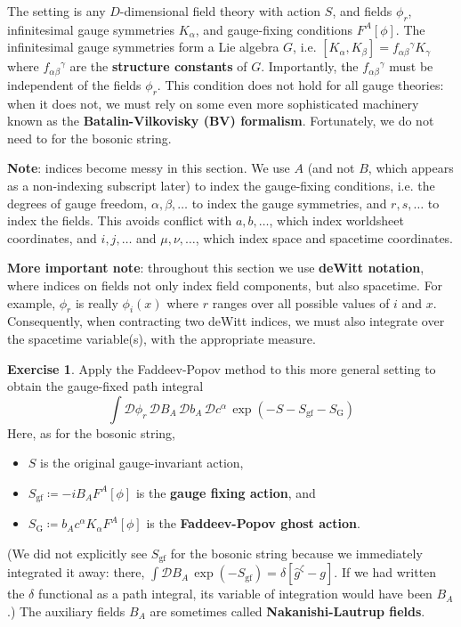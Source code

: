 \documentclass{report}
\theoremstyle{plain}
\theoremstyle{definition}
\newtheorem{exercise}{Exercise}[section]
\theoremstyle{remark}
\newcommand{\cD}{\mathcal{D}}
\begin{document}
The setting is any $D$-dimensional field theory with action $S$, and
fields $\phi_r$, infinitesimal gauge symmetries $K_\alpha$, and
gauge-fixing conditions $F^A[\phi]$. The infinitesimal gauge
symmetries form a Lie algebra $G$, i.e. $[K_\alpha, K_\beta] =
f_{\alpha\beta}{}^\gamma K_\gamma$ where $f_{\alpha\beta}{}^\gamma$
are the {\bf structure constants} of $G$. Importantly, the
$f_{\alpha\beta}{}^\gamma$ must be independent of the fields $\phi_r$.
This condition does not hold for all gauge theories: when it does not,
we must rely on some even more sophisticated machinery known as the
{\bf Batalin-Vilkovisky (BV) formalism}. Fortunately, we do not need
to for the bosonic string.

{\bf Note}: indices become messy in this section. We use $A$ (and not
$B$, which appears as a non-indexing subscript later) to index the
gauge-fixing conditions, i.e. the degrees of gauge freedom, $\alpha,
\beta, \ldots$ to index the gauge symmetries, and $r, s, \ldots$ to
index the fields. This avoids conflict with $a, b, \ldots$, which
index worldsheet coordinates, and $i, j, \ldots$ and $\mu, \nu,
\ldots$, which index space and spacetime coordinates.

{\bf More important note}: throughout this section we use {\bf deWitt
  notation}, where indices on fields not only index field components,
but also spacetime. For example, $\phi_r$ is really $\phi_i(x)$ where
$r$ ranges over all possible values of $i$ and $x$. Consequently, when
contracting two deWitt indices, we must also integrate over the
spacetime variable(s), with the appropriate measure.

\begin{exercise}
  Apply the Faddeev-Popov method to this more general setting to
  obtain the gauge-fixed path integral
  \[ \int \cD \phi_r \, \cD B_A \, \cD b_A \, \cD c^\alpha \, \exp(-S - S_{\text{gf}} - S_{\text{G}}) \]
  Here, as for the bosonic string,
  \begin{itemize}
  \item $S$ is the original gauge-invariant action,
  \item $S_{\text{gf}} \coloneqq -i B_A F^A[\phi]$ is the {\bf gauge
    fixing action}, and
  \item $S_{\text{G}} \coloneqq b_A c^\alpha K_\alpha F^A[\phi]$ is
    the {\bf Faddeev-Popov ghost action}.
  \end{itemize}
  (We did not explicitly see $S_{\text{gf}}$ for the bosonic string
  because we immediately integrated it away: there, $\int \cD B_A \,
  \exp(-S_{\text{gf}}) = \delta[\hat{g}^\zeta - g]$. If we had written
  the $\delta$ functional as a path integral, its variable of
  integration would have been $B_A$.) The auxiliary fields $B_A$ are
  sometimes called {\bf Nakanishi-Lautrup fields}.
\end{exercise}
\end{document}
